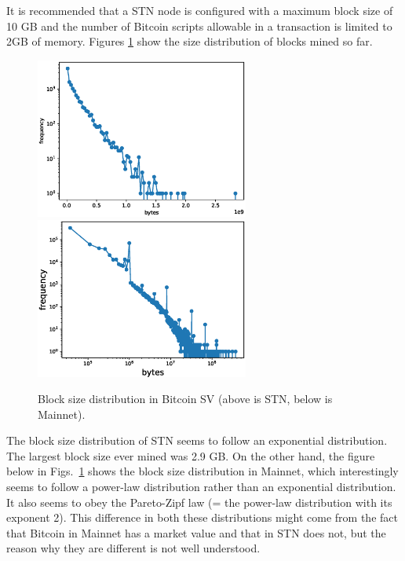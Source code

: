 \documentclass[graybox]{svmult}
\begin{document}
It is recommended that a STN node is configured with a maximum block size of 10 GB and the number of Bitcoin scripts allowable in a transaction is limited to 2GB of memory.
Figures \ref{fig:block_size} show the size distribution of blocks mined so far. 
%
\begin{figure}[t]
  \vspace{-35mm}
  \begin{center}
    \includegraphics[width=70mm]{bsv_stn-block_bytes-semilogy2.eps}
    \includegraphics[width=70mm]{bsv_mainnet-block_bytes-loglog.eps}
  \end{center}
  \vspace{35mm}
  \caption{Block size distribution in Bitcoin SV (above is STN, below is Mainnet).}
  \label{fig:block_size}
\end{figure}
%
The block size distribution of STN seems to follow an exponential distribution.
The largest block size ever mined was 2.9 GB.
On the other hand, the figure below in Figs.~\ref{fig:block_size} shows the block size distribution in Mainnet, which interestingly seems to follow a power-law distribution rather than an exponential distribution.
It also seems to obey the Pareto-Zipf law (= the power-law distribution with its exponent 2). 
This difference in both these distributions might come from the fact that Bitcoin in Mainnet has a market value and that in STN does not, but the reason why they are different is not well understood. 
\end{document}
